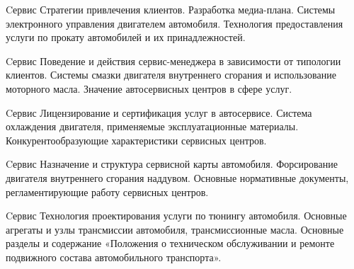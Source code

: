 \documentclass[
	11pt,
	a4paper,
	]
	{article}
\begin{document}
\vfill



\begin{minipage}[t][\miniH]{\miniL}\centering
	 {Cервис}
		{
			Стратегии привлечения клиентов. Разработка медиа-плана.
		}{
			Системы электронного управления двигателем автомобиля.
		}{
			Технология предоставления услуги по прокату автомобилей и их принадлежностей.
		}
	\lowGE
\end{minipage}





\begin{minipage}[t][\miniH]{\miniL}\centering
	 {Cервис}
		{
			Поведение и действия сервис-менеджера в зависимости от типологии клиентов.
		}{
			Системы смазки двигателя внутреннего сгорания и использование моторного масла.
		}{
			Значение автосервисных центров в сфере услуг.
		}
	\lowGE
\end{minipage}

\vfill



\begin{minipage}[t][\miniH]{\miniL}\centering
	 {Cервис}
		{
			Лицензирование и сертификация услуг в автосервисе.
		}{
			Система охлаждения двигателя, применяемые эксплуатационные материалы.
		}{
			Конкурентообразующие характеристики сервисных центров.
		}
	\lowGE
\end{minipage}

\vfill



\begin{minipage}[t][\miniH]{\miniL}\centering
	 {Cервис}
		{
			Назначение и структура сервисной карты автомобиля.
		}{
			Форсирование двигателя внутреннего сгорания наддувом.
		}{
			Основные нормативные документы, регламентирующие работу сервисных центров.
		}
	\lowGE
\end{minipage}





\begin{minipage}[t][\miniH]{\miniL}\centering
	 {Cервис}
		{
			Технология проектирования услуги по тюнингу автомобиля.
		}{
			Основные агрегаты и узлы трансмиссии автомобиля, трансмиссионные масла.
		}{
			Основные разделы и содержание «Положения о техническом обслуживании и ремонте подвижного состава автомобильного транспорта».
		}
	\lowGE
\end{minipage}
\end{document}
